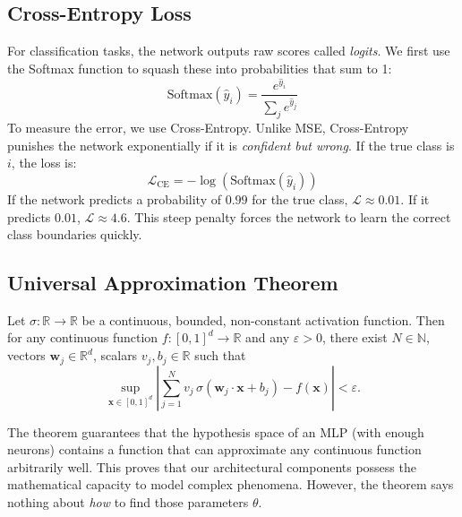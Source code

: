 \documentclass{tufte-handout}
\let\subsubsection\subsection
\begin{document}
\subsubsection{Cross-Entropy Loss}
For classification tasks, the network outputs raw scores called \textit{logits}. We first use the Softmax function to squash these into probabilities that sum to 1:
\[
\text{Softmax}(\hat{y}_i) = \frac{e^{\hat{y}_i}}{\sum_j e^{\hat{y}_j}}
\]
To measure the error, we use Cross-Entropy. Unlike MSE, Cross-Entropy punishes the network exponentially if it is \textit{confident but wrong}. If the true class is $i$, the loss is:
\[
\mathcal{L}_{\text{CE}} = -\log(\text{Softmax}(\hat{y}_i))
\]
If the network predicts a probability of $0.99$ for the true class, $\mathcal{L} \approx 0.01$. If it predicts $0.01$, $\mathcal{L} \approx 4.6$. This steep penalty forces the network to learn the correct class boundaries quickly.

\subsection{Universal Approximation Theorem}

\begin{thm}[Cybenko, 1989]
    Let $\sigma: \mathbb{R}\to\mathbb{R}$ be a continuous, bounded, non-constant activation function. Then for any continuous function $f: [0,1]^d \to \mathbb{R}$ and any $\varepsilon>0$, there exist $N\in\mathbb{N}$, vectors $\mathbf{w}_j\in\mathbb{R}^d$, scalars $v_j, b_j\in\mathbb{R}$ such that
    \[
    \sup_{\mathbf{x}\in[0,1]^d} \left| \sum_{j=1}^N v_j\,\sigma(\mathbf{w}_j\cdot\mathbf{x} + b_j) - f(\mathbf{x}) \right| < \varepsilon.
    \]
\end{thm}

The theorem guarantees that the hypothesis space of an MLP (with enough neurons) contains a function that can approximate any continuous function arbitrarily well. This proves that our architectural components possess the mathematical capacity to model complex phenomena. However, the theorem says nothing about \textit{how} to find those parameters $\theta$.
\end{document}
